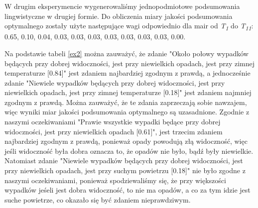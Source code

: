 \documentclass{classrep}
\begin{document}
W drugim eksperymencie wygenerowaliśmy jednopodmiotowe podsumowania lingwistyczne w drugiej formie. Do obliczenia miary jakości podsumowania optymalnego zostały użyte następujące wagi odpowiednio dla mair od \textit{T\textsubscript{1}} do \textit{T\textsubscript{11}}: 0.65, 0.10, 0.04, 0.03, 0.03, 0.03, 0.03, 0.03, 0.03, 0.03, 0.00.

Na podstawie tabeli \ref{ex2} można zauważyć, że zdanie "Około połowy wypadków będących przy dobrej widoczności, jest przy niewielkich opadach, jest przy zimnej temperaturze [0.84]" jest zdaniem najbardziej zgodnym z prawdą, a jednocześnie zdanie "Niewiele wypadków będących przy dobrej widoczności, jest przy niewielkich opadach, jest przy zimnej temperaturze [0.18]" jest zdaniem najmniej zgodnym z prawdą. Można zauważyć, że te zdania zaprzeczają sobie nawzajem, więc wyniki miar jakości podsumowania optymalnego są uzasadnione. Zgodnie z naszymi oczekiwaniami "Prawie wszystkie wypadki będące przy dobrej widoczności, jest przy niewielkich opadach [0.61]", jest trzecim zdaniem najbardziej zgodnym z prawdą, ponieważ opady powodują złą widoczność, więc jeśli widoczność była dobra oznacza to, że opadów nie było, bądź były niewielkie. Natomiast zdanie "Niewiele wypadków będących przy dobrej widoczności, jest przy niewielkich opadach, jest przy suchym powietrzu [0.18]" nie było zgodne z naszymi oczekiwaniami, ponieważ spodziewaliśmy się, że przy większości wypadków jeśeli jest dobra widoczność, to nie ma opadów, a co za tym idzie jest suche powietrze, co okazało się być zdaniem nieprawdziwym.

\newpage
\end{document}
